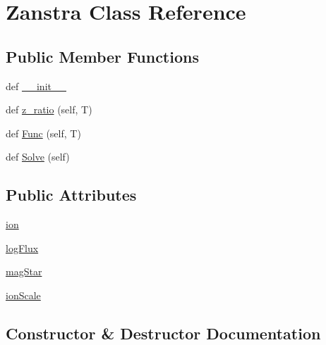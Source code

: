 \hypertarget{classpyneb_1_1utils_1_1stellar_1_1_zanstra}{}\section{Zanstra Class Reference}
\label{classpyneb_1_1utils_1_1stellar_1_1_zanstra}
\subsection*{Public Member Functions}
\begin{DoxyCompactItemize}
\item 
def \hyperlink{classpyneb_1_1utils_1_1stellar_1_1_zanstra_ac775ee34451fdfa742b318538164070e}{\+\_\+\+\_\+init\+\_\+\+\_\+}
\item 
def \hyperlink{classpyneb_1_1utils_1_1stellar_1_1_zanstra_a231acffaf4940d09c104ac19266072ee}{z\+\_\+ratio} (self, T)
\item 
def \hyperlink{classpyneb_1_1utils_1_1stellar_1_1_zanstra_a90ac59b645e37433d02bcd286b18dc2c}{Func} (self, T)
\item 
def \hyperlink{classpyneb_1_1utils_1_1stellar_1_1_zanstra_acfa2263d4f73bf98053a5a8ed10a4c41}{Solve} (self)
\end{DoxyCompactItemize}
\subsection*{Public Attributes}
\begin{DoxyCompactItemize}
\item 
\hyperlink{classpyneb_1_1utils_1_1stellar_1_1_zanstra_a1b13bcbedf5b7f9310ec3fba076e96e0}{ion}
\item 
\hyperlink{classpyneb_1_1utils_1_1stellar_1_1_zanstra_a00ccd651b0e342ae97ae41c8731045c1}{log\+Flux}
\item 
\hyperlink{classpyneb_1_1utils_1_1stellar_1_1_zanstra_a2517649f439ba0ed4c760c990a24821c}{mag\+Star}
\item 
\hyperlink{classpyneb_1_1utils_1_1stellar_1_1_zanstra_a9449c65bcffb0422723533ecc27054ae}{ion\+Scale}
\end{DoxyCompactItemize}


\subsection{Constructor \& Destructor Documentation}
\hypertarget{classpyneb_1_1utils_1_1stellar_1_1_zanstra_ac775ee34451fdfa742b318538164070e}{}
